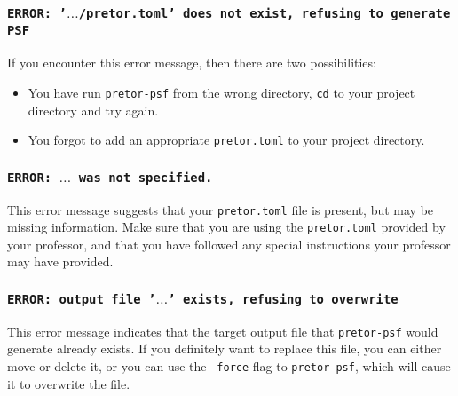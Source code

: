 \documentclass{article}
\begin{document}
\subsubsection{\texttt{ERROR: '$\hdots$/pretor.toml' does not exist, refusing to generate PSF}}

If you encounter this error message, then there are two possibilities:

\begin{itemize}

	\item You have run \texttt{pretor-psf} from the wrong directory,
		\texttt{cd} to your project directory and try again.

	\item You forgot to add an appropriate \texttt{pretor.toml} to your
		project directory.

\end{itemize}

\subsubsection{\texttt{ERROR: $\hdots$ was not specified.}}

This error message suggests that your \texttt{pretor.toml} file is present, but
may be missing information. Make sure that you are using the
\texttt{pretor.toml} provided by your professor, and that you have followed any
special instructions your professor may have provided.

\subsubsection{\texttt{ERROR: output file '$\hdots$' exists, refusing to overwrite}}

This error message indicates that the target output file that
\texttt{pretor-psf} would generate already exists. If you definitely want to
replace this file, you can either move or delete it, or you can use the
\texttt{--force} flag to \texttt{pretor-psf}, which will cause it to overwrite
the file.
\end{document}

